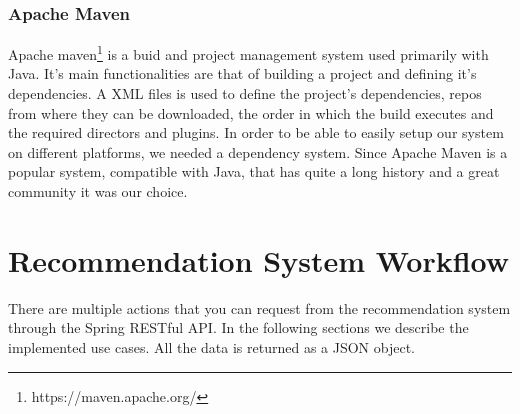 \lstset{caption=Stanford Core NLP lemmatizer code, label=lst:stanford-core-nlp}


\subsubsection{Apache Maven}
\label{sec:frameworks-apache-maven}
Apache maven\footnote{https://maven.apache.org/} is a buid and project management system used primarily with Java. It's main functionalities are that of building a project and defining it's dependencies. A XML files is used to define the project's dependencies, repos from where they can be downloaded, the order in which the build executes and the required directors and plugins.
In order to be able to easily setup our system on different platforms, we needed a dependency system. Since Apache Maven is a popular system, compatible with Java, that has quite a long history and a great community it was our choice.

\section{Recommendation System Workflow} 
\label{sec:workflow}
There are multiple actions that you can request from the recommendation system through the Spring RESTful API.
In the following sections we describe the implemented use cases.
All the data is returned as a JSON object.

